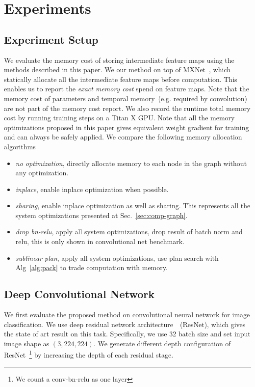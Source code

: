 \section{Experiments}

\subsection{Experiment Setup}

We evaluate the memory cost of storing intermediate feature maps using the methods described in this paper. We our method on top of MXNet~\cite{MXNet-whitepaper}, which statically allocate all the intermediate feature maps before computation. This enables us to report the \emph{exact memory cost} spend on feature maps. Note that the memory cost of parameters and temporal memory~(e.g. required by convolution) are not part of the memory cost report. We also record the runtime total memory cost  by running training steps on a Titan X GPU. Note that all the memory optimizations proposed in this paper gives equivalent weight gradient for training and can always be safely applied. We compare the following memory allocation algorithms

\begin{itemize}
 \item \emph{no optimization}, directly allocate memory to each node in the graph without any optimization.
 \item \emph{inplace}, enable inplace optimization when possible.
 \item \emph{sharing}, enable inplace optimization as well as sharing. This represents all the system optimizations presented at Sec.~\ref{sec:comp-graph}.
 \item \emph{drop bn-relu}, apply all system optimizations, drop result of batch norm and relu, this is only shown in convolutional net benchmark.
 \item \emph{sublinear plan}, apply all system optimizations, use plan search with Alg~\ref{alg:pack} to trade computation with memory.
\end{itemize}

\subsection{Deep Convolutional Network}

We first evaluate the proposed method on convolutional neural network for image classification. We use deep residual network architecture~\cite{He2016}~(ResNet), which gives the state of art result on this task. Specifically, we use 32 batch size and set input image shape as $(3, 224, 224)$. We generate different depth configuration of ResNet~\footnote{We count a conv-bn-relu as one layer} by increasing the depth of each residual stage.

